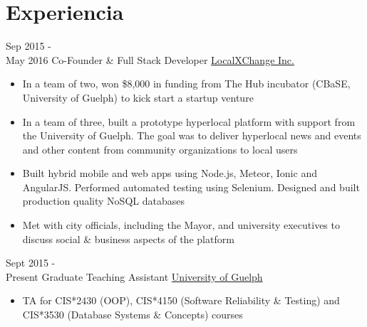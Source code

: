 \documentclass[letterpaper]{twentysecondcv} %
\begin{document}
\section{Experiencia}

\begin{twenty} %
	\twentyitem
    	{Sep 2015 - \\May 2016}
        {Co-Founder \& Full Stack Developer}
        {\href{http://www.localxchange.ca/}{LocalXChange Inc.}}
        {}
        {
        {\begin{itemize}
        \item In a team of two, won \$8,000 in funding from The Hub incubator (CBaSE, University of Guelph) to kick start a startup venture
        \item In a team of three, built a prototype hyperlocal platform with support from the University of Guelph. The goal was to deliver hyperlocal news and events and other content from community organizations to local users
        \item Built hybrid mobile and web apps using Node.js, Meteor, Ionic and AngularJS. Performed automated testing using Selenium. Designed and built production quality NoSQL databases
        \item Met with city officials, including the Mayor, and university executives to discuss social \& business aspects of the platform 
    \end{itemize}}
        }
        
    \twentyitem
   		{Sept 2015 - \\ Present}
        {Graduate Teaching Assistant}
        {\href{http://www.uoguelph.ca}{University of Guelph}}
        {}
        {
        {\begin{itemize}
        \item TA for CIS*2430 (OOP), CIS*4150 (Software Reliability \& Testing) and CIS*3530 (Database Systems \& Concepts) courses
    \end{itemize}}
        }
        

\end{twenty}
\end{document}

